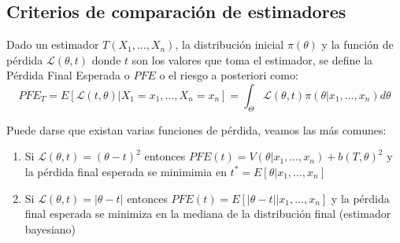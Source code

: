 \subsection{Criterios de comparación de estimadores}

\begin{definición}
Dado un estimador $T(X_1, \ldots, X_n)$, la distribución inicial $\pi(\theta)$ y la función de pérdida $\mathcal{L}(\theta, t)$ donde $t$ son los valores que toma el estimador, se define la Pérdida Final Esperada o $PFE$ o el riesgo a posteriori como:
$$PFE_T = E[\mathcal{L}(t, \theta) | X_1 = x_1, \ldots, X_n = x_n] = \int_{\Theta} \mathcal{L}(\theta, t)\pi(\theta | x_1, \ldots, x_n)d\theta$$
\end{definición}

\begin{proposición}
Puede darse que existan varias funciones de pérdida, veamos las más comunes:
\begin{enumerate}
  \item Si $\mathcal{L}(\theta, t) = (\theta - t)^2$ entonces $PFE(t) = V(\theta | x_1,
          \ldots, x_n) + b(T, \theta)^2$ y la pérdida final esperada se minimimia en $t^*
          = E[\theta | x_1, \ldots, x_n]$
  \item Si $\mathcal{L}(\theta, t) = |\theta - t|$ entonces $PFE(t) = E[|\theta - t| |
              x_1, \ldots, x_n]$ y la pérdida final esperada se minimiza en la mediana de la
        distribución final (estimador bayesiano)
\end{enumerate}
\end{proposición}

